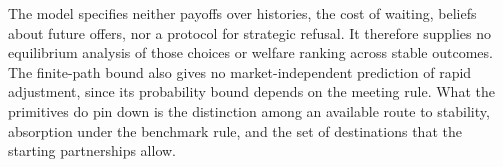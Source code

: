 \documentclass[11pt]{article}
\begin{document}
The model specifies neither payoffs over histories, the cost of waiting, beliefs about future offers, nor a protocol for strategic refusal. It therefore supplies no equilibrium analysis of those choices or welfare ranking across stable outcomes. The finite-path bound also gives no market-independent prediction of rapid adjustment, since its probability bound depends on the meeting rule. What the primitives do pin down is the distinction among an available route to stability, absorption under the benchmark rule, and the set of destinations that the starting partnerships allow.
\end{document}
